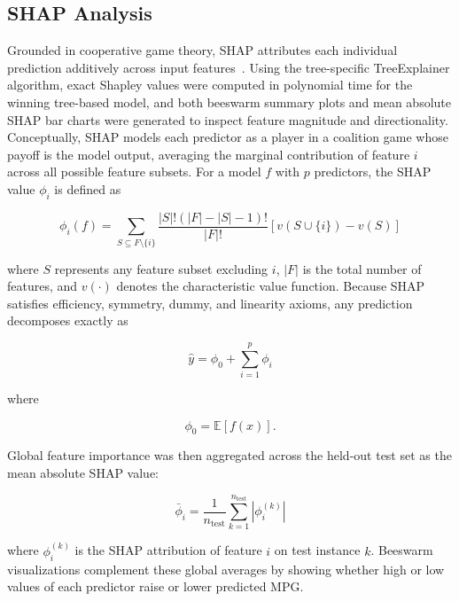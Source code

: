 \subsection{SHAP Analysis}

Grounded in cooperative game theory, SHAP attributes each individual prediction additively across input features~\cite{lundberg2017unified}. Using the tree-specific TreeExplainer algorithm, exact Shapley values were computed in polynomial time for the winning tree-based model, and both beeswarm summary plots and mean absolute SHAP bar charts were generated to inspect feature magnitude and directionality. Conceptually, SHAP models each predictor as a player in a coalition game whose payoff is the model output, averaging the marginal contribution of feature $i$ across all possible feature subsets. For a model $f$ with $p$ predictors, the SHAP value $\phi_i$ is defined as

\begin{equation}
\phi_i(f)=
\sum_{S\subseteq F\setminus\{i\}}
\frac{|S|!\left(|F|-|S|-1\right)!}{|F|!}
\left[
v(S\cup\{i\})-v(S)
\right]
\label{eq:shap}
\end{equation}

where $S$ represents any feature subset excluding $i$, $|F|$ is the total number of features, and $v(\cdot)$ denotes the characteristic value function. Because SHAP satisfies efficiency, symmetry, dummy, and linearity axioms, any prediction decomposes exactly as

\begin{equation}
\hat{y}
=
\phi_0
+
\sum_{i=1}^{p}
\phi_i
\label{eq:prediction}
\end{equation}

where

\begin{equation}
\phi_0
=
\mathbb{E}[f(x)].
\label{eq:baseline}
\end{equation}

Global feature importance was then aggregated across the held-out test set as the mean absolute SHAP value:

\begin{equation}
\bar{\phi}_i
=
\frac{1}{n_{\mathrm{test}}}
\sum_{k=1}^{n_{\mathrm{test}}}
\left|
\phi_i^{(k)}
\right|
\label{eq:mean_shap}
\end{equation}

where $\phi_i^{(k)}$ is the SHAP attribution of feature $i$ on test instance $k$. Beeswarm visualizations complement these global averages by showing whether high or low values of each predictor raise or lower predicted MPG.


